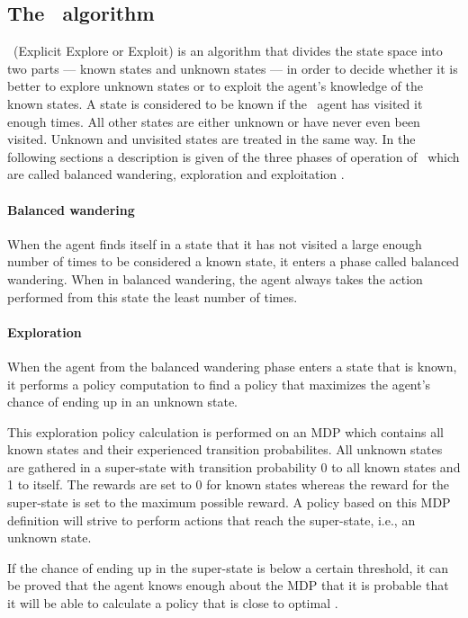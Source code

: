 \subsection{The \etre\ algorithm}
\label{sec:e3}

\etre\ (Explicit Explore or Exploit) is an algorithm that divides the state space into two parts --- known states and unknown states --- in order to decide whether it is better to explore unknown states or to exploit the agent's knowledge of the known states. A state is considered to be known if the \etre\ agent has visited it enough times. All other states are either unknown or have never even been visited. Unknown and unvisited states are treated in the same way. In the following sections a description is given of the three phases of operation of \etre\, which are called balanced wandering, exploration and exploitation \parencite{kearns2002near}.

\paragraph{Balanced wandering}

When the agent finds itself in a state that it has not visited a large enough number of times to be considered a known state, it enters a phase called balanced wandering. When in balanced wandering, the agent always takes the action performed from this state the least number of times. 


\paragraph{Exploration}
When the agent from the balanced wandering phase enters a state that is known, it performs a policy computation to find a policy that maximizes the agent's chance of ending up in an unknown state. 

This exploration policy calculation is performed on an MDP which contains all known states and their experienced transition probabilites. 
All unknown states are gathered in a super-state with transition probability 0 to all known states and 1 to itself. The rewards are set to 0 for known states whereas the reward for the super-state is set to the maximum possible reward. A policy based on this MDP definition will strive to perform actions that reach the super-state, i.e., an unknown state.

If the chance of ending up in the super-state is below a certain threshold, it can be proved that the agent knows enough about the MDP that it is probable that it will be able to calculate a policy that is close to optimal \parencite{kearns2002near}.

